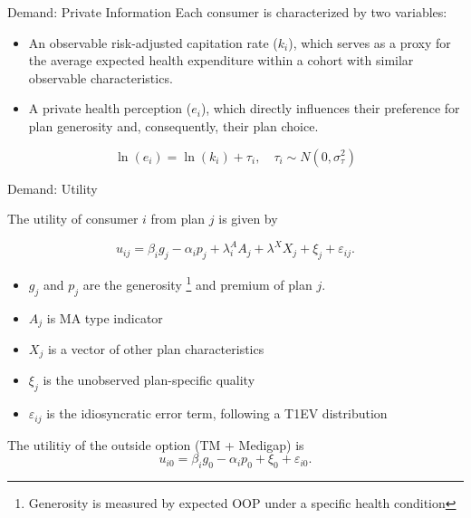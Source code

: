 \documentclass[professionalfonts, aspectratio=169]{beamer}
\begin{document}
\begin{frame}{Demand: Private Information}
  Each consumer is characterized by two variables:
  \begin{itemize}
      \item An observable risk-adjusted capitation rate ($k_i$), which serves as a proxy for the average expected health expenditure within a cohort with similar observable characteristics.
      \item A private health perception ($e_i$), which directly influences their preference for plan generosity and, consequently, their plan choice.
  \end{itemize}

  \begin{equation}
    \ln(e_i) = \ln(k_i) + \tau_i, \quad \tau_i \sim N(0, \sigma_\tau^2)
  \end{equation}

\end{frame}

\begin{frame}{Demand: Utility}

  The utility of consumer $i$ from plan $j$ is given by

  \begin{equation}
    u_{ij} = \beta_i g_j - \alpha_i p_j + \lambda^{A}_i A_j + \lambda^X X_j + \xi_j + \varepsilon_{ij}.
  \end{equation}

  \begin{itemize}\small
    \item $g_j$ and $p_j$ are the generosity \footnote{Generosity is measured by expected OOP under a specific health condition} and premium of plan $j$.
    \item $A_j$ is MA type indicator
    \item $X_j$ is a vector of other plan characteristics
    \item $\xi_j$ is the unobserved plan-specific quality
    \item $\varepsilon_{ij}$ is the idiosyncratic error term, following a T1EV distribution
  \end{itemize}

  The utilitiy of the outside option (TM + Medigap) is
  \begin{equation}
    u_{i0} = \beta_i g_0 - \alpha_i p_0 + \xi_0 + \varepsilon_{i0}.
  \end{equation}
\end{frame}
\end{document}
